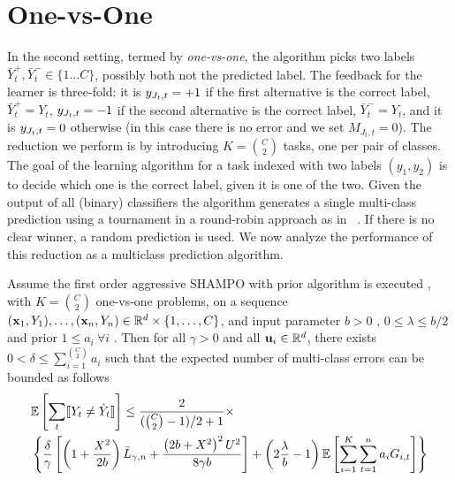 \section{One-vs-One}
In the second setting, termed by {\em one-vs-one}, the algorithm picks two labels 
$\bar{Y}^+_t,\bar{Y}^-_t \in\{1\dots C\}$, possibly both not the predicted label. 
The feedback for the learner is three-fold: it is $y_{J_t,t}=+1$ if the first alternative is the correct label, 
$\bar{Y}^+_t=Y_t$, $y_{J_t,t}=-1$ if the second alternative is the correct label, $\bar{Y}^-_t=Y_t$, 
and it is $y_{J_t,t}=0$ otherwise (in this case there is no error and we set $M_{J_t,t}=0$). 
The reduction we perform is by introducing $K= {C \choose 2}$ tasks, one per pair of classes.  
The goal of the learning algorithm for a task indexed with two labels $(y_1,y_2)$ is to decide 
which one is the correct label, given it is one of the two. Given the output of all (binary) classifiers the 
algorithm generates a single multi-class prediction using a tournament in a round-robin 
approach as in ~\cite{DBLP:journals/jmlr/Furnkranz02}. If there is no clear winner, a random prediction is used. 
We now analyze the performance of this reduction as a multiclass prediction algorithm.

\begin{corollary}
Assume the first order aggressive SHAMPO with prior algorithm is executed , with $K={C \choose 2}$ one-vs-one problems, 
on a sequence $(\mathbf{x}_1,Y_1),\ldots,(\mathbf{x}_n,Y_n)\in\mathbb{R}^d\times\{1,\ldots,C\}$, and input parameter 
$b>0$ , $0 \le \lambda \le b/2$ and prior $1\le a_i~\forall i$ . Then for all $\gamma>0$ and all $\mathbf{u}_{i}\in\mathbb{R}^d$, 
there exists $0<\delta\le \sum_{i=1}^{C \choose 2}a_{i}$ such that the expected number of multi-class 
errors can be bounded as follows
 \[
 \begin{split}
 &\mathbb{E}\left[{\sum_t [\![{Y_t \neq \hat{Y}_t}]\!]}\right]\le \frac{2}{({C \choose 2}-1)/2+1}\times\\
 &\left\{{ \frac{\delta}{\gamma}\left[{\left({1+\frac{X^2}{2b} }\right){\bar L}_{\gamma,n}+\frac{\left({{2b+X^2}}\right)^2U^{2}}{8{\gamma}b}}\right]+\left({2\frac{\lambda}{b}-1}\right)\mathbb{E}\left[{\sum_{i=1}^{K}\sum_{t=1}^{n}{a_{i}G_{i,t}}}\right]}\right\}
 \end{split}
 \]

\end{corollary}

